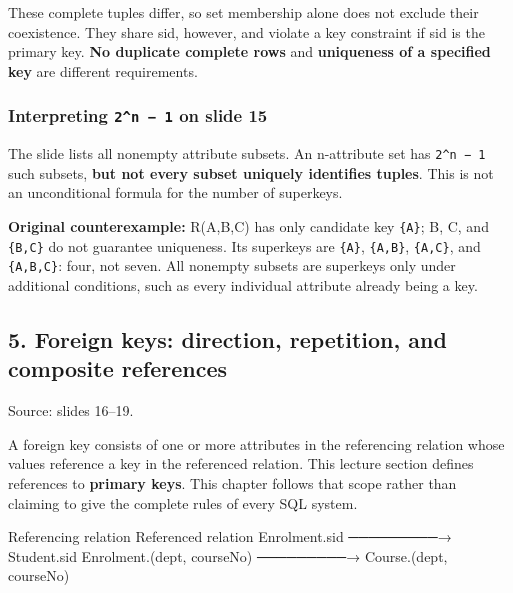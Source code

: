 These complete tuples differ, so set membership alone does not exclude their coexistence. They share sid, however, and violate a key constraint if sid is the primary key. \textbf{No duplicate complete rows} and \textbf{uniqueness of a specified key} are different requirements.

\subsubsection{\texorpdfstring{Interpreting \texttt{2\^{}n\ −\ 1} on slide 15}{Interpreting 2\^{}n − 1 on slide 15}}\label{03_relational_model_and_integrity_en-interpreting-2n-1-on-slide-15}

The slide lists all nonempty attribute subsets. An n-attribute set has \texttt{2\^{}n\ −\ 1} such subsets, \textbf{but not every subset uniquely identifies tuples}. This is not an unconditional formula for the number of superkeys.

\textbf{Original counterexample:} R(A,B,C) has only candidate key \texttt{\{A\}}; B, C, and \texttt{\{B,C\}} do not guarantee uniqueness. Its superkeys are \texttt{\{A\}}, \texttt{\{A,B\}}, \texttt{\{A,C\}}, and \texttt{\{A,B,C\}}: four, not seven. All nonempty subsets are superkeys only under additional conditions, such as every individual attribute already being a key.

\Needspace{11cm}
\subsection{5. Foreign keys: direction, repetition, and composite references}\label{03_relational_model_and_integrity_en-foreign-keys-direction-repetition-and-composite-references}


Source: slides 16--19.

A foreign key consists of one or more attributes in the referencing relation whose values reference a key in the referenced relation. This lecture section defines references to \textbf{primary keys}. This chapter follows that scope rather than claiming to give the complete rules of every SQL system.

\begin{StudyCode}
Referencing relation                        Referenced relation
Enrolment.sid                  ─────────→   Student.sid
Enrolment.(dept, courseNo)      ─────────→   Course.(dept, courseNo)
\end{StudyCode}

